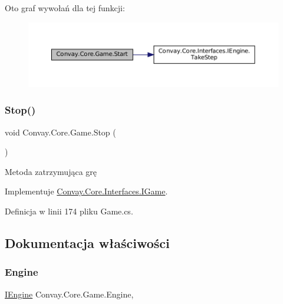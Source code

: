 Oto graf wywołań dla tej funkcji\+:
\nopagebreak
\begin{figure}[H]
\begin{center}
\leavevmode
\includegraphics[width=350pt]{class_convay_1_1_core_1_1_game_a34947ec8157eabc9eba8d5d8fd116f42_cgraph}
\end{center}
\end{figure}
\hypertarget{class_convay_1_1_core_1_1_game_a1f0547dcd642f826756cb94f0a6f907f}{}\label{class_convay_1_1_core_1_1_game_a1f0547dcd642f826756cb94f0a6f907f} 
\subsubsection{\texorpdfstring{Stop()}{Stop()}}
{\footnotesize\ttfamily void Convay.\+Core.\+Game.\+Stop (\begin{DoxyParamCaption}{ }\end{DoxyParamCaption})}



Metoda zatrzymująca grę 



Implementuje \hyperlink{interface_convay_1_1_core_1_1_interfaces_1_1_i_game_a2dec82cc222354ba16ecfa30a0158cac}{Convay.\+Core.\+Interfaces.\+I\+Game}.



Definicja w linii 174 pliku Game.\+cs.



\subsection{Dokumentacja właściwości}
\hypertarget{class_convay_1_1_core_1_1_game_a93fe3cfaff73c2e0378d78c3701ead38}{}\label{class_convay_1_1_core_1_1_game_a93fe3cfaff73c2e0378d78c3701ead38} 
\subsubsection{\texorpdfstring{Engine}{Engine}}
{\footnotesize\ttfamily \hyperlink{interface_convay_1_1_core_1_1_interfaces_1_1_i_engine}{I\+Engine} Convay.\+Core.\+Game.\+Engine\hspace{0.3cm}{\ttfamily [get]}, {\ttfamily [set]}}




